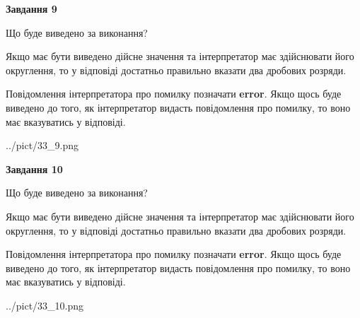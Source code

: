 \documentclass[12pt, ukrainian]{article}
\begin{document}
{\begin {Large}
{\begin {center}\textbf{Завдання 9}\end {center}}\par
Що буде виведено за виконання? \par

Якщо має бути виведено дійсне значення та інтерпретатор має здійснювати його округлення, 
то у відповіді достатньо правильно вказати два дробових розряди.

Повідомлення інтерпретатора про помилку позначати \textbf{error}.
Якщо щось буде виведено до того, як інтерпретатор видасть повідомлення про помилку, 
то воно має вказуватись у відповіді. \par

\begin{center}
	{../pict/33_9.png}
\end{center}
\newpage

{\begin {center}\textbf{Завдання 10}\end {center}}\par
Що буде виведено за виконання? \par

Якщо має бути виведено дійсне значення та інтерпретатор має здійснювати його округлення, 
то у відповіді достатньо правильно вказати два дробових розряди.

Повідомлення інтерпретатора про помилку позначати \textbf{error}.
Якщо щось буде виведено до того, як інтерпретатор видасть повідомлення про помилку, 
то воно має вказуватись у відповіді. \par

\begin{center}
	{../pict/33_10.png}
\end{center}
\newpage

\end {Large}}
\end{document}
